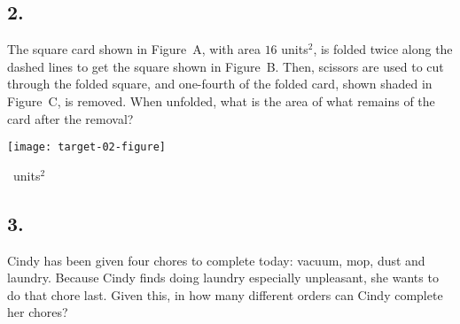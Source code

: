\documentclass[12pt]{article}
\begin{document}
\subsection*{2.}
The square card shown in Figure~A, with area $16$ units$^2$, is folded twice along the dashed lines to get the square shown in Figure~B. Then, scissors are used to cut through the folded square, and one-fourth of the folded card, shown shaded in Figure~C, is removed. When unfolded, what is the area of what remains of the card after the removal? 

\begin{minipagex}[b]{\linewidth}
\centering
\texttt{[image: target-02-figure]}
\end{minipagex}

\nopagebreak

\fbox{\phantom{ANSWER}}~units$^2$

\begin{answer}
%
\end{answer}


\subsection*{3.}
Cindy has been given four chores to complete today: vacuum, mop, dust and laundry. Because Cindy finds doing laundry especially unpleasant, she wants to do that chore last. Given this, in how many different orders can Cindy complete her chores? 

\nopagebreak
\end{document}
